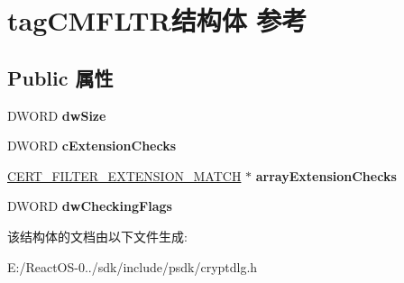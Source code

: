 \hypertarget{structtag_c_m_f_l_t_r}{}\section{tag\+C\+M\+F\+L\+T\+R结构体 参考}
\label{structtag_c_m_f_l_t_r}
\subsection*{Public 属性}
\begin{DoxyCompactItemize}
\item 
\mbox{\label{structtag_c_m_f_l_t_r_a41dfed833dce2c411471a3d416111f6b}} 
D\+W\+O\+RD {\bfseries dw\+Size}
\item 
\mbox{\label{structtag_c_m_f_l_t_r_a7404b47132bf78356086eef2d539cc99}} 
D\+W\+O\+RD {\bfseries c\+Extension\+Checks}
\item 
\mbox{\label{structtag_c_m_f_l_t_r_a39f48e8ba598f56109e248eab8349ff8}} 
\hyperlink{structtag_c_m_o_i_d}{C\+E\+R\+T\+\_\+\+F\+I\+L\+T\+E\+R\+\_\+\+E\+X\+T\+E\+N\+S\+I\+O\+N\+\_\+\+M\+A\+T\+CH} $\ast$ {\bfseries array\+Extension\+Checks}
\item 
\mbox{\label{structtag_c_m_f_l_t_r_ab382befad16b84c1da49384af3e7756b}} 
D\+W\+O\+RD {\bfseries dw\+Checking\+Flags}
\end{DoxyCompactItemize}


该结构体的文档由以下文件生成\+:\begin{DoxyCompactItemize}
\item 
E\+:/\+React\+O\+S-\/0../sdk/include/psdk/cryptdlg.\+h\end{DoxyCompactItemize}
